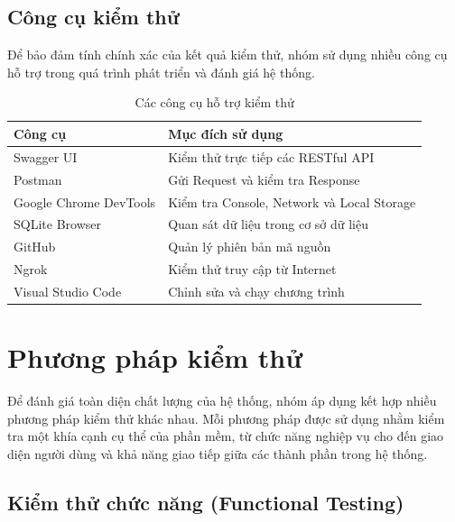 
\subsection{Công cụ kiểm thử}

Để bảo đảm tính chính xác của kết quả kiểm thử, nhóm sử dụng nhiều công cụ hỗ trợ trong quá trình phát triển và đánh giá hệ thống.

\begin{table}[H]
	\centering
	\caption{Các công cụ hỗ trợ kiểm thử}
	\label{tab:test_tool}
	\renewcommand{\arraystretch}{1.3}
	\begin{tabular}{|p{4cm}|p{9cm}|}
		\hline
		\textbf{Công cụ} & \textbf{Mục đích sử dụng} \\
		\hline
		Swagger UI & Kiểm thử trực tiếp các RESTful API \\
		\hline
		Postman & Gửi Request và kiểm tra Response \\
		\hline
		Google Chrome DevTools & Kiểm tra Console, Network và Local Storage \\
		\hline
		SQLite Browser & Quan sát dữ liệu trong cơ sở dữ liệu \\
		\hline
		GitHub & Quản lý phiên bản mã nguồn \\
		\hline
		Ngrok & Kiểm thử truy cập từ Internet \\
		\hline
		Visual Studio Code & Chỉnh sửa và chạy chương trình \\
		\hline
	\end{tabular}
\end{table}

\section{Phương pháp kiểm thử}

Để đánh giá toàn diện chất lượng của hệ thống, nhóm áp dụng kết hợp nhiều phương pháp kiểm thử khác nhau. Mỗi phương pháp được sử dụng nhằm kiểm tra một khía cạnh cụ thể của phần mềm, từ chức năng nghiệp vụ cho đến giao diện người dùng và khả năng giao tiếp giữa các thành phần trong hệ thống.


\subsection{Kiểm thử chức năng (Functional Testing)}

